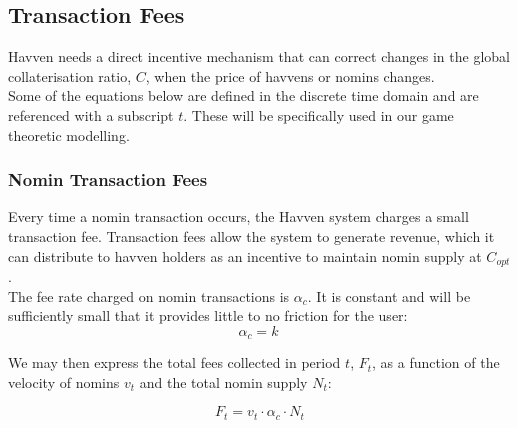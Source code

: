 \newpage
\subsection{Transaction Fees} Havven needs a direct incentive mechanism that can correct changes in the global collaterisation ratio, $C$, when the price of havvens or nomins changes. \\

\noindent Some of the equations below are defined in the discrete time domain and are referenced with a subscript $t$. These will be specifically used in our game theoretic modelling.

\subsubsection{Nomin Transaction Fees} Every time a nomin transaction occurs, the Havven system charges a small transaction fee. Transaction fees allow the system to generate revenue, which it can distribute to havven holders as an incentive to maintain nomin supply at $C_{opt}$. \\

\noindent The fee rate charged on nomin transactions is $\alpha_c$. It is constant and will be sufficiently small that it provides little to no friction for the user: \\

\begin{equation}
\alpha_c = k \ \label{eq:5}
\end{equation}

\begin{center}
\end{center}

\noindent We may then express the total fees collected in period $t$, $F_t$, as a function
of the velocity of nomins $v_t$ and the total nomin supply $N_t$:

\begin{equation}
    F_t = v_t \cdot \alpha_c \cdot N_t
\end{equation}

